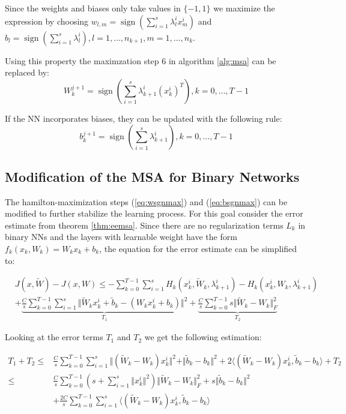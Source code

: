 \documentclass[a4paper, 12pt]{scrreprt} %
\DeclareMathOperator*{\sign}{sign}
\begin{document}
Since the weights and biases only take values in $\{-1,1\}$ we maximize the expression by choosing $w_{l,m} = \sign\left( \sum_{i=1}^s \lambda^i_l x^i_m\right)$ and $b_l = \sign \left( \sum_{i=1}^s \lambda^i_l \right), l=1,\dots,n_{k+1}, m=1,\dots,n_k$.

Using this property the maximzation step 6 in algorithm \ref{alg:msa} can be replaced by:
\begin{equation}
W_k^{j+1} = \sign\left(\sum_{i=1}^s \lambda_{k+1}^i ({x_k^i})^T\right), k=0,\dots,T-1
\label{eq:wsgnmax}
\end{equation}

If the \ac{NN} incorporates biases, they can be updated with the following rule:
\begin{equation}
b_k^{j+1} = \sign\left( \sum_{i=1}^s \lambda_{k+1}^i \right), k=0,\dots,T-1 
\label{eq:bsgnmax}
\end{equation}

\subsection{Modification of the \acl{MSA} for Binary Networks}

The hamilton-maximization steps (\ref{eq:wsgnmax}) and (\ref{eq:bsgnmax}) can be modified to further stabilize the learning process. For this goal consider the error estimate from theorem \ref{thm:eemsa}. Since there are no regularization terms $L_k$ in binary \acp{NN} and the layers with learnable weight have the form $f_k(x_k,W_k) = W_k x_k + b_k$, the equation for the error estimate can be simplified to:

\begin{align*}
&J(x,\tilde{W}) - J(x,W) \leq  - \sum_{k=0}^{T-1}\sum_{i=1}^s H_k(x_k^i,\tilde{W}_k,\lambda_{k+1}^i)-H_k(x_k^i,W_k,\lambda_{k+1}^i) \\
& + \underbrace{\frac{C}{s} \sum_{k=0}^{T-1}\sum_{i=1}^s \Vert \tilde{W}_k x_k^i + \tilde{b}_k - (W_k x_k^i + b_k) \Vert^2 }_{T_1}
 +  \underbrace{\frac{C}{s} \sum_{k=0}^{T-1} s \Vert \tilde{W}_k - W_k \Vert^2_F }_{T_2}
\end{align*}

Looking at the error terms $T_1$ and $T_2$ we get the following estimation:

\begin{align*}
T_1 + T_2 \leq &  \frac{C}{s} \sum_{k=0}^{T-1}\sum_{i=1}^s \Vert (\tilde{W}_k - W_k) x_k^i\Vert^2 + \Vert \tilde{b}_k -  b_k \Vert^2 + 2 \langle (\tilde{W}_k - W_k) x_k^i,  \tilde{b}_k -  b_k \rangle +  T_2 \\
\leq &  \frac{C}{s} \sum_{k=0}^{T-1}\left(s + \sum_{i=1}^s \Vert x_k^i \Vert^2 \right) \Vert \tilde{W}_k - W_k \Vert^2_F + s \Vert \tilde{b}_k -  b_k \Vert^2 \\
& + \frac{2C}{s}  \sum_{k=0}^{T-1}\sum_{i=1}^s \langle (\tilde{W}_k - W_k) x_k^i,  \tilde{b}_k -  b_k \rangle
\end{align*}
\end{document}
